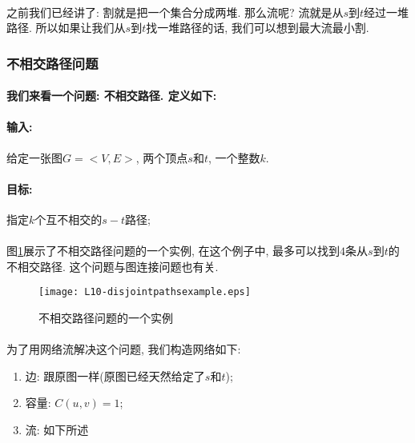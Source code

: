 \documentclass[a4paper]{article}
\renewcommand{\figurename}{图}
\begin{document}
        \paragraph{}之前我们已经讲了: 割就是把一个集合分成两堆. 那么流呢? 流就是从$s$到$t$经过一堆路径. 所以如果让我们从$s$到$t$找一堆路径的话, 我们可以想到最大流最小割.
        \subsubsection{不相交路径问题}
        \paragraph{我们来看一个问题: 不相交路径. 定义如下:}
        \paragraph{输入:}给定一张图$G=<V,E>$, 两个顶点$s$和$t$, 一个整数$k$.
        \paragraph{目标:}指定$k$个互不相交的$s-t$路径;
        \paragraph{}\figurename\ref{Figure: disjoint_path_example}展示了不相交路径问题的一个实例, 在这个例子中, 最多可以找到$4$条从$s$到$t$的不相交路径. 这个问题与图连接问题也有关. 
        \begin{figure}[h]
            \centering
            \texttt{[image: L10-disjointpathsexample.eps]}
            \caption{不相交路径问题的一个实例}
            \label{Figure: disjoint_path_example}
        \end{figure}
        
        \paragraph{}为了用网络流解决这个问题, 我们构造网络如下:
        \begin{enumerate}
         \item 边: 跟原图一样(原图已经天然给定了$s$和$t$);
         \item 容量: $C(u,v)=1$;
         \item 流: 如下所述%
        \end{enumerate}
\end{document}
